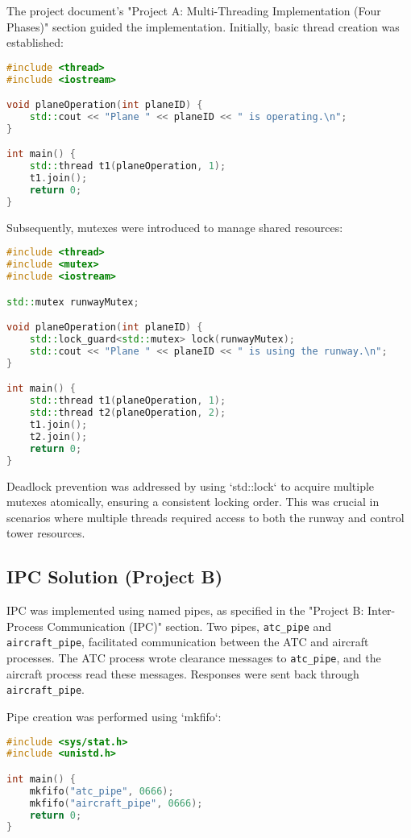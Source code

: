 \documentclass{article}
\begin{document}
The project document's "Project A: Multi-Threading Implementation (Four Phases)" section guided the implementation. Initially, basic thread creation was established:

\begin{lstlisting}[language=C++, caption={Basic Thread Creation}, label={lst:basic_thread}]
#include <thread>
#include <iostream>

void planeOperation(int planeID) {
    std::cout << "Plane " << planeID << " is operating.\n";
}

int main() {
    std::thread t1(planeOperation, 1);
    t1.join();
    return 0;
}
\end{lstlisting}

Subsequently, mutexes were introduced to manage shared resources:

\begin{lstlisting}[language=C++, caption={Mutex Synchronization}, label={lst:mutex_sync}]
#include <thread>
#include <mutex>
#include <iostream>

std::mutex runwayMutex;

void planeOperation(int planeID) {
    std::lock_guard<std::mutex> lock(runwayMutex);
    std::cout << "Plane " << planeID << " is using the runway.\n";
}

int main() {
    std::thread t1(planeOperation, 1);
    std::thread t2(planeOperation, 2);
    t1.join();
    t2.join();
    return 0;
}
\end{lstlisting}

Deadlock prevention was addressed by using `std::lock` to acquire multiple mutexes atomically, ensuring a consistent locking order. This was crucial in scenarios where multiple threads required access to both the runway and control tower resources.

\subsection{IPC Solution (Project B)}
IPC was implemented using named pipes, as specified in the "Project B: Inter-Process Communication (IPC)" section. Two pipes, \texttt{atc\_pipe} and \texttt{aircraft\_pipe}, facilitated communication between the ATC and aircraft processes. The ATC process wrote clearance messages to \texttt{atc\_pipe}, and the aircraft process read these messages. Responses were sent back through \texttt{aircraft\_pipe}.

Pipe creation was performed using `mkfifo`:

\begin{lstlisting}[language=C++, caption={Pipe Creation}, label={lst:pipe_create}]
#include <sys/stat.h>
#include <unistd.h>

int main() {
    mkfifo("atc_pipe", 0666);
    mkfifo("aircraft_pipe", 0666);
    return 0;
}
\end{lstlisting}
\end{document}
